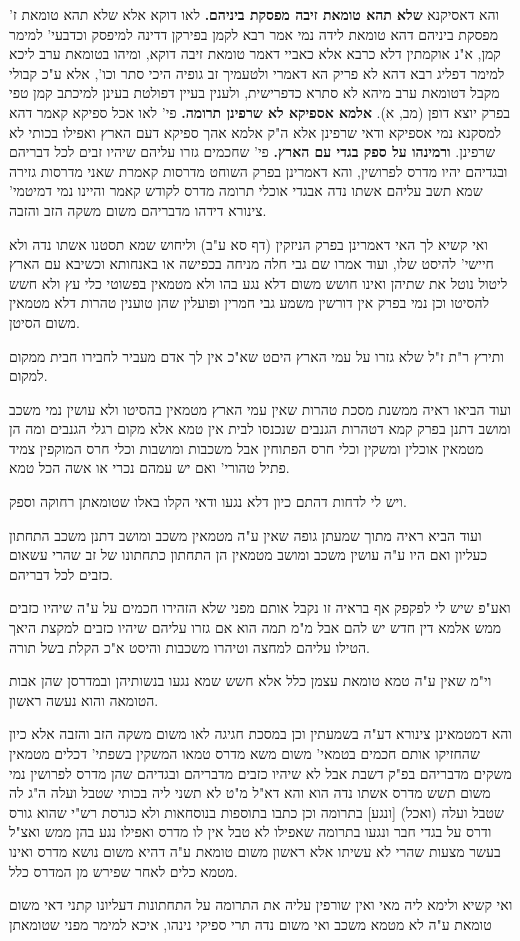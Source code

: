 \documentclass[12pt, openany]{book}
\begin{document}
{{ והא דאסיקנא \textbf{שלא תהא טומאת זיבה מפסקת ביניהם.} לאו דוקא אלא שלא תהא טומאת ז' מפסקת ביניהם דהא טומאת לידה נמי אמר רבא לקמן בפירקן דדינה למיפסק וכדבעי' למימר קמן, א"נ אוקמתין דלא כרבא אלא כאביי דאמר טומאת זיבה דוקא, ומיהו בטומאת ערב ליכא למימר דפליג רבא דהא לא פריק הא דאמרי ולטעמיך זב גופיה היכי סתר וכו', אלא ע"כ קבולי מקבל דטומאת ערב מיהא לא סתרא כדפרישית, ולענין בעיין דפולטת בעינן למיכתב קמן טפי בפרק יוצא דופן (מב, א). 
\textbf{אלמא אספיקא לא שרפינן תרומה.} פי' לאו אכל ספיקא קאמר דהא למסקנא נמי אספיקא ודאי שרפינן אלא ה"ק אלמא אהך ספיקא דעם הארץ ואפילו בכותי לא שרפינן. 
\textbf{ורמינהו על ספק בגדי עם הארץ.} פי' שחכמים גזרו עליהם שיהיו זבים לכל דבריהם ובגדיהם יהיו מדרס לפרושין, והא דאמרינן בפרק השוחט מדרסות קאמרת שאני מדרסות גזירה שמא תשב עליהם אשתו נדה אבגדי אוכלי תרומה מדרס לקודש קאמר והיינו נמי דמיטמי' צינורא דידהו מדבריהם משום משקה הזב והזבה.\par ואי קשיא לך האי דאמרינן בפרק הניזקין (דף סא ע"ב) וליחוש שמא תסטנו אשתו נדה ולא חיישי' להיסט שלו, ועוד אמרו שם גבי חלה מניחה בכפישה או באנחותא וכשיבא עם הארץ ליטול נוטל את שתיהן ואינו חושש משום דלא נגע בהו ולא מטמאין בפשוטי כלי עץ ולא חשש להסיטו וכן נמי בפרק אין דורשין משמע גבי חמרין ופועלין שהן טוענין טהרות דלא מטמאין משום הסיטן.\par ותירץ ר"ת ז"ל שלא גזרו על עמי הארץ היםט שא"כ אין לך אדם מעביר לחבירו חבית ממקום למקום.\par ועוד הביאו ראיה ממשנת מסכת טהרות שאין עמי הארץ מטמאין בהסיטו ולא עושין נמי משכב ומושב דתנן בפרק קמא דטהרות הגנבים שנכנסו לבית אין טמא אלא מקום רגלי הגנבים ומה הן מטמאין אוכלין ומשקין וכלי חרס הפתוחין אבל משכבות ומושבות וכלי חרס המוקפין צמיד פתיל טהורי' ואם יש עמהם נכרי או אשה הכל טמא.\par ויש לי לדחות דהתם כיון דלא נגעו ודאי הקלו באלו שטומאתן רחוקה וספק.\par ועוד הביא ראיה מתוך שמעתן גופה שאין ע"ה מטמאין משכב ומושב דתנן משכב התחתון כעליון ואם היו ע"ה עושין משכב ומושב מטמאין הן התחתון כתחתונו של זב שהרי עשאום כזבים לכל דבריהם.\par ואע"פ שיש לי לפקפק אף בראיה זו נקבל אותם מפני שלא הזהירו חכמים על ע"ה שיהיו כזבים ממש אלמא דין חדש יש להם אבל מ"מ תמה הוא אם גזרו עליהם שיהיו כזבים למקצת היאך הטילו עליהם למחצה וטיהרו משכבות והיסט א"כ הקלת בשל תורה.\par וי"מ שאין ע"ה טמא טומאת עצמן כלל אלא חשש שמא נגעו בנשותיהן ובמדרסן שהן אבות הטומאה והוא נעשה ראשון.\par והא דמטמאינן צינורא דע"ה בשמעתין וכן במסכת חגיגה לאו משום משקה הזב והזבה אלא כיון שהחזיקו אותם חכמים בטמאי' משום משא מדרס טמאו המשקין בשפתי' דכלים מטמאין משקים מדבריהם בפ"ק דשבת אבל לא שיהיו כזבים מדבריהם ובגדיהם שהן מדרס לפרושין נמי משום תשש מדרס אשתו נדה הוא והא דא"ל מ"ט לא תשני ליה בכותי שטבל ועלה ה"ג לה שטבל ועלה (ואכל) [ונגע] בתרומה וכן כתבו בתוספות בנוסחאות ולא כגרסת רש"י שהוא גורס ודרס על בגדי חבר ונגעו בתרומה שאפילו לא טבל אין לו מדרס ואפילו נגע בהן ממש ואצ"ל בעשר מצעות שהרי לא עשיתו אלא ראשון משום טומאת ע"ה דהיא משום נושא מדרס ואינו מטמא כלים לאחר שפירש מן המדרס כלל.\par ואי קשיא ולימא ליה מאי ואין שורפין עליה את התרומה על התחתונות דעליונו קתני דאי משום טומאת ע"ה לא מטמא משכב ואי משום נדה תרי ספיקי נינהו, איכא למימר מפני שטומאתן }}
\end{document}
